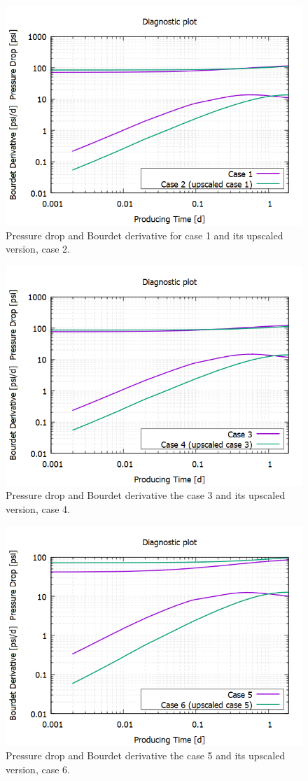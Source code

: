 \begin{figure}[H]
	\centering
	\includegraphics[width=0.8\linewidth]{Images/52}
	\caption{Pressure drop and Bourdet derivative for case 1 and its upscaled version, case 2.}
	\label{fig:52}
\end{figure}

\begin{figure}[H]
	\centering
	\includegraphics[width=0.8\linewidth]{Images/53}
	\caption{Pressure drop and Bourdet derivative the case 3 and its upscaled version, case 4.}
	\label{fig:53}
\end{figure}

\begin{figure}[H]
	\centering
	\includegraphics[width=0.8\linewidth]{Images/54}
	\caption{Pressure drop and Bourdet derivative the case 5 and its upscaled version, case 6.}
	\label{fig:54}
\end{figure}

